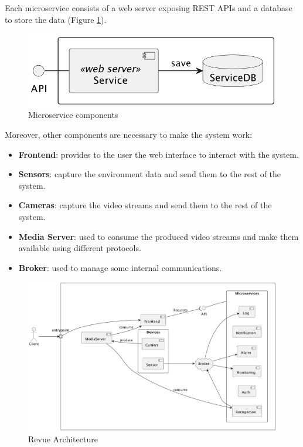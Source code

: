 \documentclass{scrartcl}
\begin{document}
    Each microservice consists of a web server exposing REST APIs and a database to store the data (Figure \ref{fig:microservice}).

    \begin{figure}
        \centering
        \includegraphics[scale=0.6]{img/microservice}
        \caption{Microservice components}
        \label{fig:microservice}
    \end{figure}

    Moreover, other components are necessary to make the system work:

    \begin{itemize}
        \item \textbf{Frontend}: provides to the user the web interface to interact with the system.
        \item \textbf{Sensors}: capture the environment data and send them to the rest of the system.
        \item \textbf{Cameras}: capture the video streams and send them to the rest of the system.
        \item \textbf{Media Server}: used to consume the produced video streams and make them available using different protocols.
        \item \textbf{Broker}: used to manage some internal communications.
    \end{itemize}

    \begin{figure}[ht]
        \centering
        \includegraphics[scale=0.51]{img/architecture}
        \caption{Revue Architecture}
        \label{fig:architecture}
    \end{figure}
\end{document}
